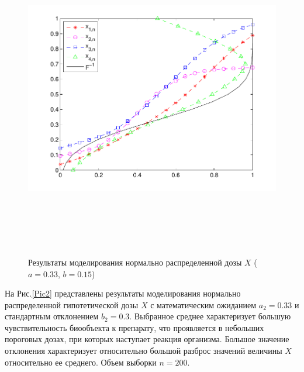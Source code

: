 \documentclass[a4paper,14pt,russian]{article}
\begin{document}
\begin{figure}[h]
\center
\caption{Результаты моделирования нормально распределенной дозы $X$ ($a=0.33$,  $b=0.15$)}\label{Pic1}
\includegraphics[width = 500pt,height = 400pt]{7.pdf}
\end{figure}






\newpage

На Рис.\ref{Pic2} представлены результаты моделирования нормально распределенной гипотетической дозы $X$ с математическим ожиданием $a_2 = 0.33$ и стандартным отклонением $b_2 = 0.3$. Выбранное среднее характеризует большую чувствительность биообъекта к препарату, что проявляется в небольших пороговых дозах, при которых наступает реакция организма. Большое значение отклонения характеризует относительно большой разброс значений величины $X$ относительно ее среднего. Объем выборки $n = 200$.
\end{document}
